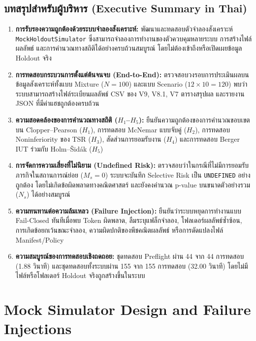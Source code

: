 \documentclass[10pt,a4paper]{article}
\begin{document}
\subsection{\texorpdfstring{บทสรุปสำหรับผู้บริหาร (Executive Summary in Thai)}{Executive Summary in Thai}}
{\thaifont\small
\begin{enumerate}
    \item \textbf{การรับรองความถูกต้องด้วยระบบจำลองสังเคราะห์:} พัฒนาและทดสอบตัวจำลองสังเคราะห์ \texttt{MockHoldoutSimulator} ซึ่งสามารถจำลองการทำงานของตัวควบคุมหลายระบบ การสร้างไฟล์ผลลัพธ์ และการคำนวณทางสถิติได้อย่างครบถ้วนสมบูรณ์ โดยไม่ต้องเข้าถึงหรือเปิดเผยข้อมูล Holdout จริง
    \item \textbf{การทดสอบกระบวนการตั้งแต่ต้นจนจบ (End-to-End):} ตรวจสอบวงรอบการประเมินผลบนข้อมูลสังเคราะห์ทั้งแบบ Mixture ($N=100$) และแบบ Scenario ($12 \times 10 = 120$) พบว่าระบบสามารถสร้างไฟล์ระเบียนผลลัพธ์ CSV ของ V9, V8.1, V7 ตารางสรุปผล และรายงาน JSON ที่มีค่าแฮชถูกต้องครบถ้วน
    \item \textbf{ความสอดคล้องของการคำนวณทางสถิติ ($H_1$--$H_5$):} ยืนยันความถูกต้องของการคำนวณขอบเขตบน Clopper--Pearson ($H_1$), การทดสอบ McNemar แบบจับคู่ ($H_2$), การทดสอบ Noninferiority ของ TSR ($H_3$), สัดส่วนการยอมรับงาน ($H_4$) และการทดสอบ Berger IUT ร่วมกับ Holm--Šidák ($H_5$)
    \item \textbf{การจัดการความเสี่ยงที่ไม่นิยาม (Undefined Risk):} ตรวจสอบว่าในกรณีที่ไม่มีการยอมรับภารกิจในสถานการณ์ย่อย ($M_s = 0$) ระบบจะบันทึก Selective Risk เป็น \texttt{UNDEFINED} อย่างถูกต้อง โดยไม่เกิดข้อผิดพลาดทางคณิตศาสตร์ และยังคงคำนวณ p-value บนขนาดตัวอย่างรวม ($N_s$) ได้อย่างสมบูรณ์
    \item \textbf{ความทนทานต่อความล้มเหลว (Failure Injection):} ยืนยันว่าระบบหยุดการทำงานแบบ Fail-Closed ทันทีเมื่อพบ Token ผิดพลาด, ลืมระบุแฟล็กจำลอง, โฟลเดอร์ผลลัพธ์ซ้ำซ้อน, การเกิดข้อยกเว้นขณะจำลอง, ความผิดปกติของพีชคณิตผลลัพธ์ หรือการดัดแปลงไฟล์ Manifest/Policy
    \item \textbf{ความสมบูรณ์ของการทดสอบเชิงถดถอย:} ชุดทดสอบ Preflight ผ่าน 44 จาก 44 การทดสอบ (1.88 วินาที) และชุดทดสอบทั้งระบบผ่าน 155 จาก 155 การทดสอบ (32.00 วินาที) โดยไม่มีไฟล์หรือโฟลเดอร์ Holdout จริงถูกสร้างขึ้นในระบบ
\end{enumerate}
}

\section{Mock Simulator Design and Failure Injections}
\end{document}
